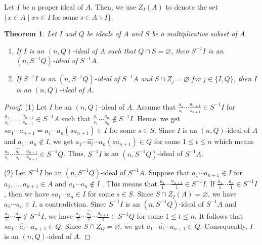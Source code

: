 \documentclass[preprint,review,10pt]{amsart}
\newtheorem{theorem}{Theorem}[section]
\theoremstyle{definition}
\theoremstyle{remark}
\numberwithin{equation}{section}
\begin{document}
Let     $I$ be a proper ideal of $A$.  Then, we  use $Z_I(A)$ to denote  the set $\{x \in A \mid xs \in I \  \text{for some} \ s \in A \backslash I\}$.
 \begin{theorem} \label{5}
Let $I$ and $Q$ be ideals of $A$ and $S$ be a multiplicative subset of $A$. 
\begin{enumerate}
\item If $I$ is an $(n,Q)$-ideal of $A$ such that  $Q \cap S=\varnothing$, then $S^{-1}I$ is an $(n,S^{-1}Q)$-ideal of $S^{-1}A$.
\item If $S^{-1}I$ is  an $(n,S^{-1}Q)$-ideal of $S^{-1}A$ and $S \cap Z_j=\varnothing$ for $j \in\{I,Q\}$, then $I$ is an $(n,Q)$-ideal of $A$.
\end{enumerate} 
\end{theorem}
\begin{proof}
(1) Let $I$ be an $(n,Q)$-ideal of $A$. Assume that $  \frac{a
_1}{s_1}\cdots\frac{a_{n+1}}{s_{n+1}} \in S^{-1}I$ for  $ \frac{a
_1}{s_1},\ldots,\frac{a_{n+1}}{s_{n+1}} \in S^{-1}A$ such that $  \frac{a_1}{s_1}\cdots\frac{a_n}{s_n} \notin S^{-1}I$. Hence, we get $ sa_1\cdots a_{n+1}=a_1\cdots a_n(sa_{n+1}) \in I$ for some $s \in S$. Since $I$ is an $(n,Q)$-ideal  of $A$ and $a_1\cdots a_n \notin I$, we get $a_1\cdots \widehat{a_t} \cdots a_n (sa_{n+1})\in Q$ for some $1 \leq t \leq n$ which means  $ \frac{a
_1}{s_1}\cdots \widehat{\frac{a_t}{s_t}} \cdots \frac{a_{n+1}}{s_{n+1}} \in S^{-1}Q$. Thus,  $S^{-1}I$ is an $(n,S^{-1}Q)$-ideal of $S^{-1}A$.

(2) Let  $S^{-1}I$ be an $(n,S^{-1}Q)$-ideal of $S^{-1}A$. Suppose that $  a_1 \cdots a_{n+1} \in I$ for $a_1, \ldots, a_{n+1} \in A$ and $  a_1 \cdots a_n \notin I$ . This means that $\frac{a_1}{1} \cdots \frac{a_{n+1}}{1} \in S^{-1}I$. If $\frac{a_1}{1} \cdots \frac{a_n}{1} \in S^{-1}I$, then we have $sa_1\cdots a_n \in I$ for some $s \in S$. Since  $S \cap Z_I(A)=\varnothing$, we have  $a_1\cdots a_n \in I$, a contradiction. Since $S^{-1}I$ is an $(n,S^{-1}Q)$-ideal of $S^{-1}A$ and $\frac{a_1}{1} \cdots \frac{a_n}{1} \notin S^{-1}I$, we have $\frac{a_1}{1} \cdots \widehat{\frac{a_t}{1}} \cdots  \frac{a_{n+1}}{1} \in S^{-1}Q$ for some $1 \leq t \leq n$. It follows that $sa_1\cdots \widehat{a_t} \cdots a_{n+1} \in Q$. Since $S \cap Z_Q=\varnothing$, we get $a_1\cdots \widehat{a_t} \cdots a_{n+1} \in Q$. Consequently, $I$ is an $(n,Q)$-ideal of $A$.
\end{proof}
\end{document}
